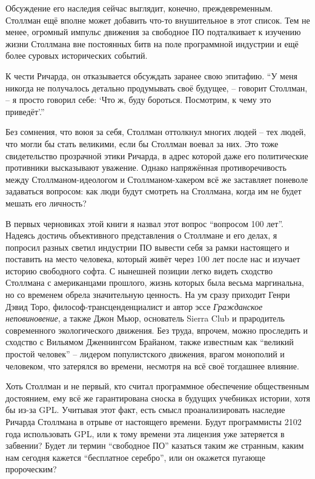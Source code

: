Обсуждение его наследия сейчас выглядит, конечно, преждевременным. Столлман ещё вполне может добавить что-то внушительное в этот список. Тем не менее, огромный импульс движения за свободное ПО подталкивает к изучению жизни Столлмана вне постоянных битв на поле программной индустрии и ещё более суровых исторических событий.

К чести Ричарда, он отказывается обсуждать заранее свою эпитафию. \enquote{У меня никогда не получалось детально продумывать своё будущее, -- говорит Столлман, -- я просто говорил себе: \enquote{Что ж, буду бороться. Посмотрим, к чему это приведёт}.\hspace{0.01in}}

Без сомнения, что воюя за себя, Столлман оттолкнул многих людей -- тех людей, что могли бы стать великими, если бы Столлман воевал за них. Это тоже свидетельство прозрачной этики Ричарда, в адрес которой даже его политические противники высказывают уважение. Однако напряжённая противоречивость между Столлманом-идеологом и Столлманом-хакером всё же заставляет поневоле задаваться вопросом: как люди будут смотреть на Столлмана, когда им не будет мешать его личность?

В первых черновиках этой книги я назвал этот вопрос \enquote{вопросом 100 лет}. Надеясь достичь объективного представления о Столлмане и его делах, я попросил разных светил индустрии ПО вывести себя за рамки настоящего и поставить на место человека, который живёт через 100 лет после нас и изучает историю свободного софта. С нынешней позиции легко видеть сходство Столлмана с американцами прошлого, жизнь которых была весьма маргинальна, но со временем обрела значительную ценность. На ум сразу приходит Генри Дэвид Торо, философ-трансценденциалист и автор эссе \textit{Гражданское неповиновение}, а также Джон Мьюр, основатель Sierra Club и прародитель современного экологического движения. Без труда, впрочем, можно проследить и сходство с Вильямом Дженнингсом Брайаном, также известным как \enquote{великий простой человек} -- лидером популистского движения, врагом монополий и человеком, что затерялся во времени, несмотря на всё своё тогдашнее влияние.

Хоть Столлман и не первый, кто считал программное обеспечение общественным достоянием, ему всё же гарантирована сноска в будущих учебниках истории, хотя бы из-за GPL. Учитывая этот факт, есть смысл проанализировать наследие Ричарда Столлмана в отрыве от настоящего времени. Будут программисты 2102 года использовать GPL, или к тому времени эта лицензия уже затеряется в забвении? Будет ли термин \enquote{свободное ПО} казаться таким же странным, каким нам сегодня кажется \enquote{бесплатное серебро}, или он окажется пугающе пророческим?

